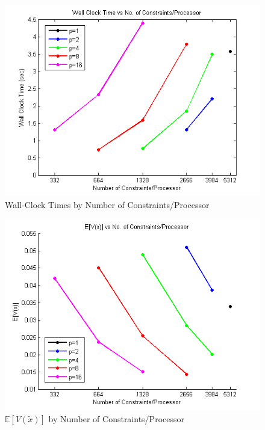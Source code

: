 \documentclass[12pt]{article}
\begin{document}
\begin{figure}[ht]
	\centering
		\includegraphics{../plot/figs/wct_numconstraint.png}
	\caption{Wall-Clock Times by Number of Constraints/Processor}
	\label{fig:wct_numconstraint}
\end{figure}

\begin{figure}[ht]
	\centering
		\includegraphics{../plot/figs/expviolprob_numconstraint.png}
	\caption{$\mathbb{E}[V(\tilde{x})]$ by Number of Constraints/Processor}
	\label{fig:expviolprob_numconstraint}
\end{figure}
\end{document}
